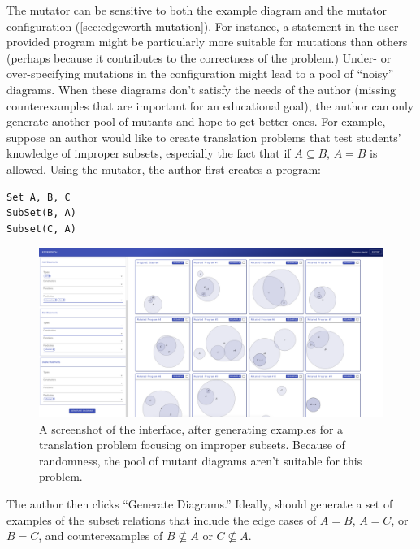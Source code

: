 The \Edgeworth mutator can be sensitive to both the example diagram and the mutator configuration (\cref{sec:edgeworth-mutation}). For instance, a statement in the user-provided \Substance program might be particularly more suitable for mutations than others (perhaps because it contributes to the correctness of the problem.) Under- or over-specifying mutations in the configuration might lead to a pool of ``noisy'' diagrams. When these diagrams don't satisfy the needs of the author (\eg missing counterexamples that are important for an educational goal), the author can only generate another pool of mutants and hope to get better ones. For example, suppose an author would like to create translation problems that test students' knowledge of improper subsets, especially the fact that if $A \subseteq B$, $A = B$ is allowed. Using the \Edgeworth mutator, the author first creates a \Substance program:

\begin{center}
\begin{verbatim}
Set A, B, C
SubSet(B, A)
Subset(C, A)
\end{verbatim}
    
\end{center}

\begin{figure}
    \centering
    \includegraphics[width=\linewidth]{assets/appendix/edgeworth-bad-output.pdf}
    \caption{A screenshot of the \Edgeworth interface, after generating examples for a translation problem focusing on improper subsets. Because of randomness, the pool of mutant diagrams aren't suitable for this problem.}
    \label{fig:edgeworth-bad-output}
\end{figure}

The author then clicks ``Generate Diagrams.'' Ideally, \Edgeworth should generate a set of examples of the subset relations that include the edge cases of $A = B$, $A = C$, or $B = C$, and counterexamples of $B \not\subseteq A$ or $C \not\subseteq A$. 

